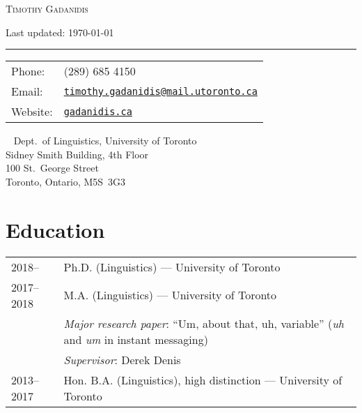 \documentclass[letterpaper]{article}
\def\name{Timothy Gadanidis}
\begin{document}
\thispagestyle{plain}

\centerline{\Huge \scshape \name}
\vspace{0.2em}
\centerline{\large {}}
\vspace{0.2em}
\centerline{\footnotesize Last updated: \today}

\medskip\hrule height 1pt

\vspace{0.25in}

\begin{tabular}{ll}
    Phone: & (289) 685 4150 \\
    Email: & \href{mailto:timothy.gadanidis@mail.utoronto.ca}%
    {\texttt{timothy.gadanidis@mail.utoronto.ca}} \\
    Website: & \href{http://www.gadanidis.ca}{\texttt{gadanidis.ca}}
\end{tabular}%
\hfill%
\begin{minipage}{0.4\linewidth}
    \raggedright\
    {%
        \hfill Dept.\ of Linguistics, University of Toronto\\
        \hfill Sidney Smith Building, 4th Floor\\
        \hfill 100 St.\ George Street\\
        \hfill Toronto, Ontario, M5S~3G3\\
    }
\end{minipage}

\section*{Education}
\begin{tabular}{p{}p{}}
    2018-- & Ph.D. (Linguistics) --- University of Toronto \\
    2017--2018 & M.A. (Linguistics) --- University of Toronto \\
               & \hspace{1em}\emph{Major research paper}: ``Um, about that, uh, variable''
                 (\emph{uh} and \emph{um} in instant messaging) \\
               & \hspace{1em}\emph{Supervisor}: Derek Denis \\
    2013--2017 & Hon. B.A. (Linguistics), high distinction --- University
    of Toronto \\
\end{tabular}
\end{document}
